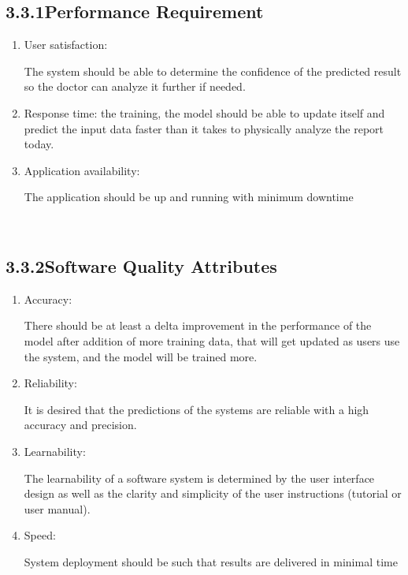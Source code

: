 \documentclass[oneside,a4paper,12pt]{book}
\begin{document}
\subsection*{3.3.1\hspace*{10pt}Performance Requirement}
\begin{enumerate}
    	\item User satisfaction:\par	 The system should be able to determine the confidence of the predicted result so the doctor can analyze it further if needed. 
    	\item 	Response time: \parAfter the training, the model should be able to update itself and predict the input data faster than it takes to physically analyze the report today.
    	\item Application availability:\par The application should be up and running with minimum downtime


	\
\end{enumerate}\par



\subsection*{3.3.2\hspace*{10pt}Software Quality Attributes}
\begin{enumerate}
	\item \textcolor[HTML]{222222}{Accuracy:}\par There should be at least a delta improvement in the performance of the model after addition of more training data, that will get updated as users use the system, and the model will be trained more.


	\item \textcolor[HTML]{222222}{Reliability:}\par It is desired that the predictions of the systems are reliable with a high accuracy and precision. 

	\item \textcolor[HTML]{222222}{ Learnability:}\par The learnability of a software system is determined by the user interface design as well as the clarity and simplicity of the user instructions (tutorial or user manual).
	
	\item \textcolor[HTML]{222222}{ Speed:}\par System deployment should be such that results are delivered in minimal time





	
\end{enumerate}\par
\end{document}
